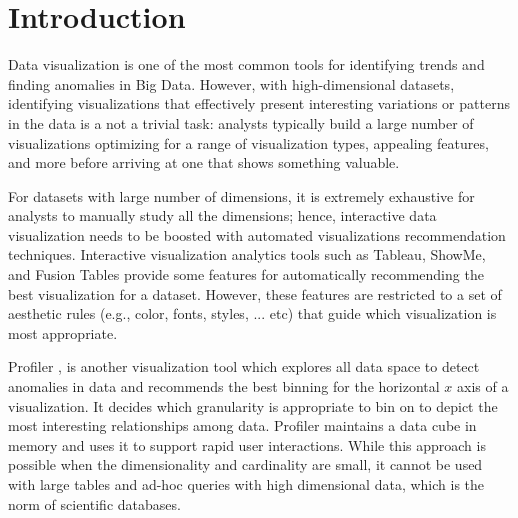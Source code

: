 \section{Introduction}
\label{sec:intro}
%
Data visualization is one of the most common tools for identifying trends and finding anomalies in Big Data. 
%
However, with high-dimensional datasets, identifying visualizations that effectively present interesting variations or patterns in the data is a not a trivial task: analysts typically build a large number of visualizations optimizing for a range of visualization types, appealing features, and more before arriving at one that shows something valuable. 
%

For datasets with large number of dimensions, it is extremely exhaustive for analysts to manually study all the dimensions; hence, interactive data visualization needs to be boosted with automated visualizations recommendation techniques.
%
Interactive visualization analytics tools such as Tableau, ShowMe, and Fusion Tables \cite{DBLP:conf/sigmod/GonzalezHJLMSSG10,DBLP:journals/tvcg/MackinlayHS07,Stolte:2000:PSQ:857190.857686} provide some features for automatically recommending the best visualization for a dataset. However, these features are restricted to a set of aesthetic rules (e.g., color, fonts, styles, ... etc) that guide which visualization is most appropriate.
%
%
%
%
%

Profiler \cite{kandel2012profiler}, is another visualization tool which explores all data space to detect anomalies in data and recommends the best binning for the horizontal $x$ axis of a visualization. It decides which granularity is appropriate to bin on to depict the most interesting relationships among data.
%
%
%
%
%
Profiler \cite{kandel2012profiler} maintains a data cube in memory and uses it to support rapid user interactions.
%
While this approach is possible when the dimensionality and cardinality are small, it cannot be used with large tables and ad-hoc queries with high dimensional data, which is the norm of scientific databases.
%

